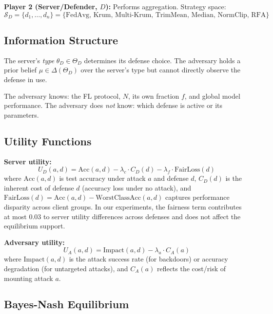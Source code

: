 \documentclass{article}
\newcommand{\SD}{\mathcal{S}_D}
\newcommand{\UA}{U_A}
\newcommand{\UD}{U_D}
\newcommand{\thetaD}{\theta_D}
\newcommand{\ThetaD}{\Theta_D}
\begin{document}
\textbf{Player 2 (Server/Defender, $D$):} Performs aggregation. Strategy space:
\begin{equation}
    \SD = \{d_1, \ldots, d_n\} = \{\text{FedAvg, Krum, Multi-Krum, TrimMean, Median, NormClip, RFA}\}
\end{equation}

\subsection{Information Structure}

The server's \emph{type} $\thetaD \in \ThetaD$ determines its defense choice. The adversary holds a prior belief $\mu \in \Delta(\ThetaD)$ over the server's type but cannot directly observe the defense in use.

The adversary knows: the FL protocol, $N$, its own fraction $f$, and global model performance. The adversary does \emph{not} know: which defense is active or its parameters.

\subsection{Utility Functions}

\textbf{Server utility:}
\begin{equation}
    \UD(a, d) = \text{Acc}(a, d) - \lambda_c \cdot C_D(d) - \lambda_f \cdot \text{FairLoss}(d)
    \label{eq:server_utility}
\end{equation}
where $\text{Acc}(a, d)$ is test accuracy under attack $a$ and defense $d$, $C_D(d)$ is the inherent cost of defense $d$ (accuracy loss under no attack), and $\text{FairLoss}(d) = \text{Acc}(a,d) - \text{WorstClassAcc}(a,d)$ captures performance disparity across client groups. In our experiments, the fairness term contributes at most 0.03 to server utility differences across defenses and does not affect the equilibrium support.

\textbf{Adversary utility:}
\begin{equation}
    \UA(a, d) = \text{Impact}(a, d) - \lambda_a \cdot C_A(a)
    \label{eq:adv_utility}
\end{equation}
where $\text{Impact}(a, d)$ is the attack success rate (for backdoors) or accuracy degradation (for untargeted attacks), and $C_A(a)$ reflects the cost/risk of mounting attack $a$.

\subsection{Bayes-Nash Equilibrium}
\end{document}
